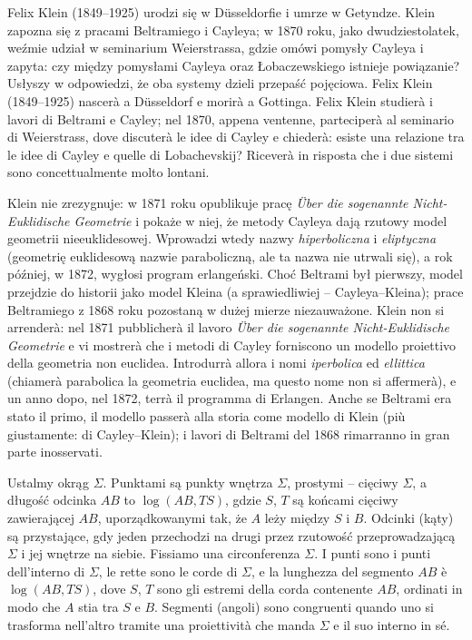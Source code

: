 Felix Klein (1849--1925) urodzi się w Düsseldorfie i umrze w Getyndze. %
Klein zapozna się z pracami Beltramiego i Cayleya; w 1870 roku, jako dwudziestolatek, weźmie udział w seminarium Weierstrassa, gdzie omówi pomysły Cayleya i zapyta: czy między pomysłami Cayleya oraz Łobaczewskiego istnieje powiązanie? %
Usłyszy w odpowiedzi, że oba systemy dzieli przepaść pojęciowa. %
Felix Klein (1849--1925) nascerà a Düsseldorf e morirà a Gottinga. %
Felix Klein studierà i lavori di Beltrami e Cayley; nel 1870, appena ventenne, parteciperà al seminario di Weierstrass, dove discuterà le idee di Cayley e chiederà: esiste una relazione tra le idee di Cayley e quelle di Lobachevskij? %
Riceverà in risposta che i due sistemi sono concettualmente molto lontani. %
%
%

Klein nie zrezygnuje: w 1871 roku opublikuje pracę \emph{Über die sogenannte Nicht-Euklidische Geometrie} i pokaże w niej, że metody Cayleya dają rzutowy model geometrii nieeuklidesowej. %
Wprowadzi wtedy nazwy \emph{hiperboliczna} i \emph{eliptyczna} (geometrię euklidesową nazwie paraboliczną, ale ta nazwa nie utrwali się), a rok później, w 1872, wygłosi program erlangeński. %
Choć Beltrami był pierwszy, model przejdzie do historii jako model Kleina (a sprawiedliwiej -- Cayleya--Kleina); prace Beltramiego z 1868 roku pozostaną w dużej mierze niezauważone. %
Klein non si arrenderà: nel 1871 pubblicherà il lavoro \emph{Über die sogenannte Nicht-Euklidische Geometrie} e vi mostrerà che i metodi di Cayley forniscono un modello proiettivo della geometria non euclidea. %
Introdurrà allora i nomi \emph{iperbolica} ed \emph{ellittica} (chiamerà parabolica la geometria euclidea, ma questo nome non si affermerà), e un anno dopo, nel 1872, terrà il programma di Erlangen. %
Anche se Beltrami era stato il primo, il modello passerà alla storia come modello di Klein (più giustamente: di Cayley--Klein); i lavori di Beltrami del 1868 rimarranno in gran parte inosservati. %

\begin{definition}
[model Beltramiego-Kleina] %
[modello di Beltrami-Klein] %
	Ustalmy okrąg $\Sigma$. %
	Punktami są punkty wnętrza $\Sigma$, prostymi -- cięciwy $\Sigma$, a długość odcinka $AB$ to $\log(AB, TS)$, gdzie $S$, $T$ są końcami cięciwy zawierającej $AB$, uporządkowanymi tak, że $A$ leży między $S$ i $B$. %
	Odcinki (kąty) są przystające, gdy jeden przechodzi na drugi przez rzutowość przeprowadzającą $\Sigma$ i jej wnętrze na siebie. %
	Fissiamo una circonferenza $\Sigma$. %
	I punti sono i punti dell'interno di $\Sigma$, le rette sono le corde di $\Sigma$, e la lunghezza del segmento $AB$ è $\log(AB, TS)$, dove $S$, $T$ sono gli estremi della corda contenente $AB$, ordinati in modo che $A$ stia tra $S$ e $B$. %
	Segmenti (angoli) sono congruenti quando uno si trasforma nell'altro tramite una proiettività che manda $\Sigma$ e il suo interno in sé. %
\end{definition}

